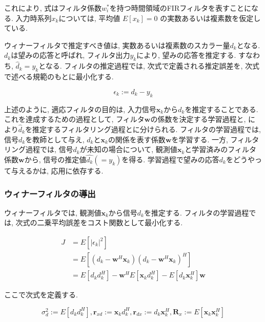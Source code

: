 これにより, 式はフィルタ係数\({w_i^*}\)を持つ時間領域のFIRフィルタを表すことになる. 入力時系列\({x_k}\)については, 平均値
\(E[x_k]=0\) の実数あるいは複素数を仮定している. 

ウィナーフィルタで推定すべき値は, 実数あるいは複素数のスカラー量\(d_k\)となる. \(d_k\)は望みの応答と呼ばれ, フィルタ出力\(y_k\)により, 望みの応答を推定する. すなわち, \(\hat{d}_k = y_k\)となる. フィルタの推定過程では, 次式で定義される推定誤差を, 次式で述べる規範のもとに最小化する. 

\begin{equation}
\epsilon_k := d_k - y_k
\end{equation}

上述のように, 適応フィルタの目的は, 入力信号\(\bm{x}_k\)から\(d_k\)を推定することである. 
これを達成するための過程として, フィルタ\(\bm{w}\)の係数を決定する学習過程と, により\(\hat{d}_k\)を推定するフィルタリング過程とに分けられる. 
フィルタの学習過程では, 信号\(d_k\)を教師として与え, \(d_k\)と\(\bm{x}_k\)の関係を表す係数\(\bm{w}\)を学習する. 
一方, フィルタリング過程では, 信号\(d_k\)が未知の場合について, 観測値\(\bm{x}_k\)と学習済みのフィルタ係数\(\bm{w}\)から, 信号の推定値\(\hat{d_k} (= y_k)\)を得る. 学習過程で望みの応答\(d_k\)をどうやって与えるかは, 応用に依存する\cite{signal_processing_for_array}. 

\subsubsection{ウィナーフィルタの導出}\label{wiener-introduction}

ウィナーフィルタでは, 観測値\(\bm{x}_k\)から信号\(d_k\)を推定する. フィルタの学習過程では, 次式の二乗平均誤差をコスト関数として最小化する. 

\begin{equation}
\begin{split}
J &= E[|\epsilon_k|^2] \\
  &= E[ (d_k - \bm{w}^H \bm{x}_k) (d_k - \bm{w}^H \bm{x}_k)^H ] \\
  &= E[ d_k d_k^H] - \bm{w}^H E[\bm{x}_k d_k^H] - E[d_k \bm{x}_k^H ] \bm{w} 
\end{split}
\label{equ:J_epsilon}
\end{equation}

ここで次式を定義する. 

\begin{equation}
\sigma_d^2 := E[d_k d_k^H], \bm{r}_{xd} := \bm{x}_k d_k^H, \bm{r}_{dx} := d_k \bm{x}_k^H, \bm{R}_x := E[\bm{x}_k \bm{x}_k^H]
\end{equation}

